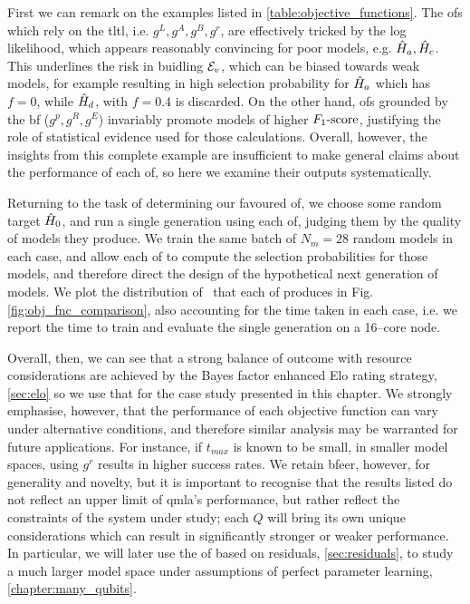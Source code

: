 First we can remark on the examples listed in \cref{table:objective_functions}. 
The \glspl{of} which rely on the \gls{tltl}, i.e. $g^L, g^A, g^B, g^r$, 
    are effectively tricked by the log likelihood, which appears reasonably convincing for 
    poor models, e.g. $\hat{H}_a, \hat{H}_c$. 
This underlines the risk in buidling ${ \mathcal{E} }_v$, which can be biased towards weak models, 
    for example resulting in high selection probability for $\hat{H}_a$ which has $f=0$, 
    while $\hat{H}_d$, with $f=0.4$ is discarded. 
On the other hand, \glspl{of} grounded by the \gls{bf} ($g^p, g^R, g^E$) invariably 
    promote models of higher $ F_{1}\text{-score} $, justifying the role of statistical evidence 
    used for those calculations. 
Overall, however, the insights from this complete example are insufficient to 
    make general claims about the performance of each \gls{of}, 
    so here we examine their outputs systematically. 
\par 

Returning to the task of determining our favoured \gls{of}, 
    we choose some random target $\hat{H}_0$, 
    and run a single generation using each \gls{of}, 
    judging them by the quality of models they produce.
We train the same batch of $N_m=28$ random models in each case, and allow each \gls{of} 
    to compute the selection probabilities for those models, 
    and therefore direct the design of the hypothetical next generation of models. 
We plot the distribution of \fs \ that each \gls{of} produces in Fig. \ref{fig:obj_fnc_comparison},
    also accounting for the time taken in each case, i.e. 
    we report the time to train and evaluate the single generation on a 16--core node.
\par

Overall, then, we can see that a strong balance of outcome with resource considerations 
    are achieved by the Bayes factor enhanced Elo rating strategy, \cref{sec:elo}
    so we use that for the case study presented in this chapter. 
We strongly emphasise, however, that the performance of each objective function
    can vary under alternative conditions, and therefore similar analysis may 
    be warranted for future applications. 
For instance, if $t_{max}$ is known to be small, 
    in smaller model spaces, using $g^r$ results in higher success rates.
We retain \gls{bfeer}, however, for generality and novelty, 
    but it is important to recognise that the results listed do not reflect
    an upper limit of \gls{qmla}'s performance, 
    but rather reflect the constraints of the system under study; 
    each $Q$ will bring its own unique considerations which can result in 
    significantly stronger or weaker performance. 
In particular, we will later use the \gls{of} based on residuals, \cref{sec:residuals}, 
    to study a much larger model space under assumptions of perfect parameter learning, \cref{chapter:many_qubits}.



